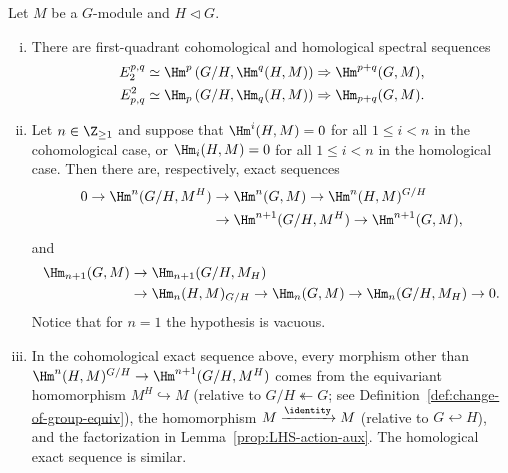 \begin{theorem}
\label{prop:LHS-SS}
	Let $M$ be a $G$-module and $H\lhd G$.
	\begin{enumerate}[(i)]
		\item There are first-quadrant cohomological and homological spectral
		sequences
		\begin{align*}
			E_2^{p,q}&\simeq\Hm^p\left(G/H,\Hm^q(H,M)\right)
			\Rightarrow\Hm^{p+q}(G,M),\\
			E^2_{p,q}&\simeq\Hm_p\left(G/H,\Hm_q(H,M)\right)
			\Rightarrow\Hm_{p+q}(G,M).
		\end{align*}
		\item Let $n\in\Z_{\geq1}$ and suppose that
		$\Hm^i(H,M)=0$ for all $1\leq i<n$ in the cohomological case, or
		$\Hm_i(H,M)=0$ for all $1\leq i<n$ in the homological case. Then there
		are, respectively, exact sequences
		\begin{equation*}\begin{split}
			0\to\Hm^n(G/H,M^H)&\to\Hm^n(G,M)\to\Hm^n(H,M)^{G/H}\\
			&\to\Hm^{n+1}(G/H,M^H)\to\Hm^{n+1}(G,M),
		\end{split}\end{equation*}
		and
		\begin{equation*}\begin{split}
			\Hm_{n+1}(G,M)&\to\Hm_{n+1}(G/H,M_H)\\
			&\to\Hm_n(H,M)_{G/H}\to\Hm_n(G,M)
			\to\Hm_n(G/H,M_H)\to0.
		\end{split}\end{equation*}
		Notice that for $n=1$ the hypothesis is vacuous.
		\item In the cohomological exact sequence above, every morphism other
		than $\Hm^n(H,M)^{G/H}\to\Hm^{n+1}(G/H,M^H)$ comes from the equivariant
		homomorphism $M^H\hookrightarrow M$ (relative to
		$G/H\twoheadleftarrow G$; see Definition~\ref{def:change-of-group-equiv}),
		the homomorphism $M\xrightarrow{\identity}M$ (relative to
		$G\hookleftarrow H$), and the factorization in
		Lemma~\ref{prop:LHS-action-aux}. The homological exact sequence is
		similar.
	\end{enumerate}
\end{theorem}
